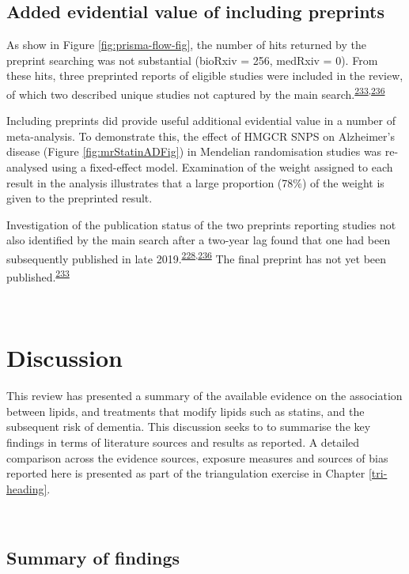 \documentclass[a4paper, twoside]{templates/ociamthesis}
\begin{document}
\hypertarget{sys-rev-including-preprints-res}{%
\subsection{Added evidential value of including preprints}\label{sys-rev-including-preprints-res}}

As show in Figure \ref{fig:prisma-flow-fig}, the number of hits returned by the preprint searching was not substantial (bioRxiv = 256, medRxiv = 0). From these hits, three preprinted reports of eligible studies were included in the review, of which two described unique studies not captured by the main search.\textsuperscript{\protect\hyperlink{ref-so2017}{233},\protect\hyperlink{ref-andrews2019}{236}}

Including preprints did provide useful additional evidential value in a number of meta-analysis. To demonstrate this, the effect of HMGCR SNPS on Alzheimer's disease (Figure \ref{fig:mrStatinADFig}) in Mendelian randomisation studies was re-analysed using a fixed-effect model. Examination of the weight assigned to each result in the analysis illustrates that a large proportion (78\%) of the weight is given to the preprinted result.

Investigation of the publication status of the two preprints reporting studies not also identified by the main search after a two-year lag found that one had been subsequently published in late 2019.\textsuperscript{\protect\hyperlink{ref-andrews2021}{228},\protect\hyperlink{ref-andrews2019}{236}} The final preprint has not yet been published.\textsuperscript{\protect\hyperlink{ref-so2017}{233}}

~

\hypertarget{discussion-1}{%
\section{Discussion}\label{discussion-1}}

This review has presented a summary of the available evidence on the association between lipids, and treatments that modify lipids such as statins, and the subsequent risk of dementia. This discussion seeks to to summarise the key findings in terms of literature sources and results as reported. A detailed comparison across the evidence sources, exposure measures and sources of bias reported here is presented as part of the triangulation exercise in Chapter \ref{tri-heading}.

~

\hypertarget{summary-of-findings}{%
\subsection{Summary of findings}\label{summary-of-findings}}
\end{document}
